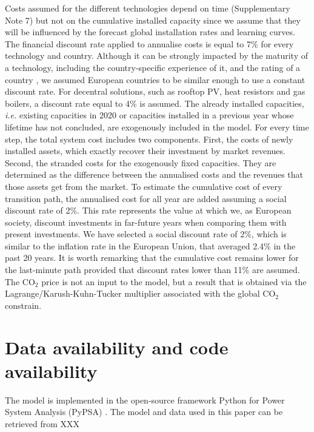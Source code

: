 \documentclass[5p]{elsarticle} %
\begin{document}
Costs assumed for the different technologies depend on time (Supplementary Note 7) but not on the cumulative installed capacity since we assume that they will be influenced by the forecast global installation rates and learning curves. The financial discount rate applied to annualise costs is equal to 7\% for every technology and country. Although it can be strongly impacted by the maturity of a technology, including the country-specific experience of it, and the rating of a country \cite{Egli_2019}, we assumed European countries to be similar enough to use a constant discount rate. For decentral solutions, such as rooftop PV, heat resistors and gas boilers, a discount rate equal to 4\% is assumed. The already installed capacities, \textit{i.e.} existing capacities in 2020 or capacities installed in a previous year whose lifetime has not concluded, are exogenously included in the model. For every time step, the total system cost includes two components. First, the costs of newly installed assets, which exactly recover their investment by market revenues. Second, the stranded costs for the exogenously fixed capacities. They are determined as the difference between the annualised costs and the revenues that those assets get from the market.  To estimate the cumulative cost of every transition path, the annualised cost for all year are added assuming a social discount rate of 2\%. This rate represents the value at which we, as European society, discount investments in far-future years when comparing them with present investments. We have selected a social discount rate of 2\%, which is similar to the inflation rate in the European Union, that averaged 2.4\% in the past 20 years. It is worth remarking that the cumulative cost remains lower for the last-minute path provided that discount rates lower than 11\% are assumed. The CO$_2$ price is not an input to the model, but a result that is obtained via the Lagrange/Karush-Kuhn-Tucker multiplier associated with the global CO$_2$ constrain. 

\section{Data availability and code availability}

The model is implemented in the open-source framework Python for Power System Analysis (PyPSA) \cite{PyPSA}. The model and data used in this paper can be retrieved from \textcolor[rgb]{1,0,0}{XXX}
\end{document}
